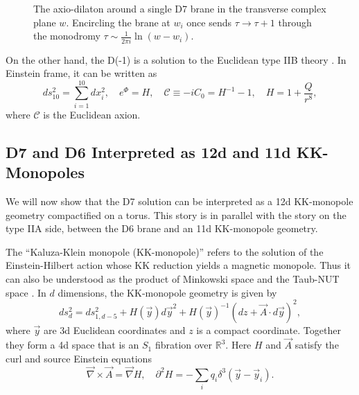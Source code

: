 \begin{figure}[ht]
\centering
{}
\caption{The axio-dilaton around a single D7 brane in the transverse complex plane $w$. Encircling the brane at $w_i$ once sends $\tau\to\tau+1$ through the monodromy $\tau\sim\frac{1}{2\pi i}\ln(w-w_i)$.
}
\label{fig:d7-monodromy}
\end{figure}

On the other hand, the D(-1) is a solution to the Euclidean type IIB theory \cite{Gibbons:1995vg}.
In Einstein frame, it can be written as
\begin{equation}
ds_{10}^2 = \sum_{i=1}^{10} dx_i^2,\quad
e^\Phi = H, \quad\mathcal C\equiv-iC_0 = H^{-1}-1,\quad
H=1+\frac{Q}{r^8},
\label{D-1 background}
\end{equation}
where $\mathcal{C}$ is the Euclidean axion.

\subsection{D7 and D6 Interpreted as 12d and 11d KK-Monopoles}
We will now show that the D7 solution can be interpreted as a 12d KK-monopole geometry compactified on a torus.
This story is in parallel with the story on the type IIA side, between the D6 brane and an 11d KK-monopole geometry.

The ``Kaluza-Klein monopole (KK-monopole)'' \cite{Gross:1983hb,Sorkin:1983ns} refers to the solution of the Einstein-Hilbert action whose KK reduction yields a magnetic monopole.
Thus it can also be understood as the product of Minkowski space and the Taub-NUT space \cite{Ortin:2015hya}.
In $d$ dimensions, the KK-monopole geometry is given by
\cite{Eguchi:1980jx}
\begin{equation}
ds_d^2 = ds_{1,d-5}^2 + H(\vec{y})d\vec{y}^2 + H(\vec{y})^{-1}(dz + \vec{A}\cdot d\vec{y})^2,
\label{d-dim KK-monopole}
\end{equation}
where $\vec{y}$ are 3d Euclidean coordinates and $z$ is a compact coordinate.
Together they form a 4d space that is an $S_1$ fibration over $\mathbb{R}^3$.
Here $H$ and $\vec{A}$ satisfy the curl and source Einstein equations
\begin{equation}
\vec{\nabla} \times \vec A = \vec\nabla H,\quad
\partial^2 H=-\sum_i q_i \delta^3(\vec{y}-\vec{y}_i).
\label{kk monopole einstein eqs}
\end{equation}


